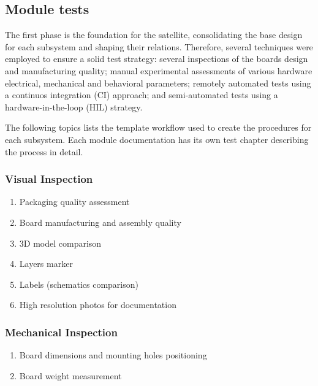 \subsection{Module tests}

The first phase is the foundation for the satellite, consolidating the base design for each subsystem and shaping their relations. Therefore, several techniques were employed to ensure a solid test strategy: several inspections of the boards design and manufacturing quality; manual experimental assessments of various hardware electrical, mechanical and behavioral parameters; remotely automated tests using a continuos integration (CI) approach; and semi-automated tests using a hardware-in-the-loop (HIL) strategy.

The following topics lists the template workflow used to create the procedures for each subsystem. Each module documentation has its own test chapter describing the process in detail.

\subsubsection{Visual Inspection} 
\begin{enumerate} \setlength\itemsep{-0.3em}
    \item Packaging quality assessment
    \item Board manufacturing and assembly quality
    \item 3D model comparison
    \item Layers marker
    \item Labels (schematics comparison) 
    \item High resolution photos for documentation
\end{enumerate}

\subsubsection{Mechanical Inspection}
\begin{enumerate} \setlength\itemsep{-0.3em}
    \item Board dimensions and mounting holes positioning
    \item Board weight measurement
\end{enumerate}

